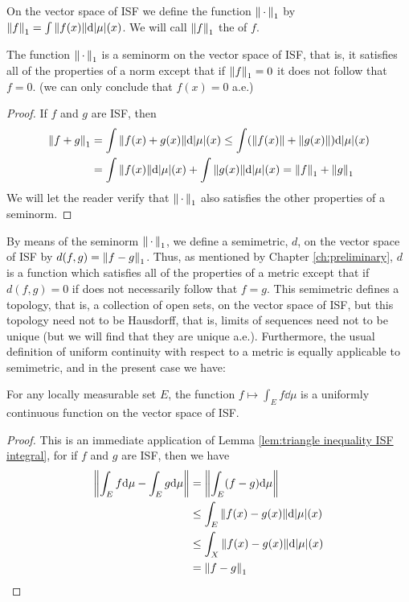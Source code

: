 \begin{definition}
On the vector space of ISF we define the function $\norm{\,\cdot\,}_1$ by $\norm{f}_1=\int\norm{f(x)}\dd|\mu|(x)$. We will call $\norm{f}_1$ the  of $f$.
\end{definition}

\begin{lemma}\label{lem:L1 seminorm on ISF}
The function $\norm{\,\cdot\,}_1$ is a seminorm on the vector space of ISF, that is, it satisfies all of the properties of a norm except that if $\norm{f}_1=0$ it does not follow that $f=0$. (we can only conclude that $f(x)=0$ a.e.)
\end{lemma}
\begin{proof}
If $f$ and $g$ are ISF, then
\begin{align*}
    \norm{f+g}_1&=\int\norm{f(x)+g(x)}\dd|\mu|(x)\leq\int(\norm{f(x)}+\norm{g(x)})\dd|\mu|(x)\\
    &=\int\norm{f(x)}\dd|\mu|(x)+\int\norm{g(x)}\dd|\mu|(x)=\norm{f}_1+\norm{g}_1
\end{align*}
We will let the reader verify that $\norm{\,\cdot\,}_1$ also satisfies the other properties of a seminorm.
\end{proof}

By means of the seminorm $\norm{\,\cdot\,}_1$, we define a semimetric, $d$, on the vector space of ISF by $d(f,g)=\norm{f-g}_1$. Thus, as mentioned by Chapter \ref{ch:preliminary}, $d$ is a function which satisfies all of the properties of a metric except that if $d(f,g)=0$ if does not necessarily follow that $f=g$. This semimetric defines a topology, that is, a collection of open sets, on the vector space of ISF, but this topology need not to be Hausdorff, that is, limits of sequences need not to be unique (but we will find that they are unique a.e.). Furthermore, the usual definition of uniform continuity with respect to a metric is equally applicable to semimetric, and in the present case we have:

\begin{lemma}\label{lem:integral on E uniform cts on ISF}
For any locally measurable set $E$, the function $f\mapsto\int_Ef\dd\mu$ is a uniformly continuous function on the vector space of ISF.
\end{lemma}

\begin{proof}
This is an immediate application of Lemma \ref{lem:triangle inequality ISF integral}, for if $f$ and $g$ are ISF, then we have
\begin{align*}
    \norm{\int_Ef\dd\mu-\int_Eg\dd\mu}&=\norm{\int_E(f-g)\dd\mu}\\
    &\leq\int_E\norm{f(x)-g(x)}\dd|\mu|(x)\\
    &\leq\int_X\norm{f(x)-g(x)}\dd|\mu|(x)\\
    &=\norm{f-g}_1
\end{align*}
\end{proof}

